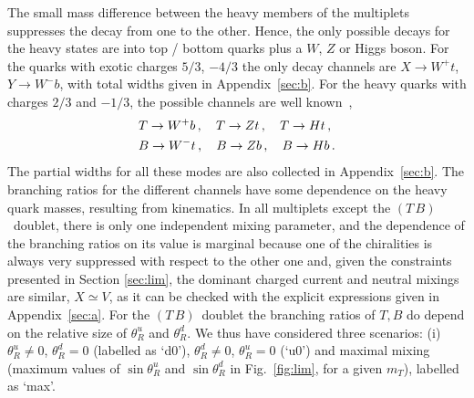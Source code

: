 \documentclass[12pt,a4paper]{article}
\newcommand{\tb}{$(T\,B)$}
\begin{document}
The small mass difference between the heavy members of the multiplets suppresses the decay from one to the other. Hence, the only possible decays for the heavy states are into top / bottom quarks plus a $W$, $Z$ or Higgs boson. For the quarks with exotic charges $5/3$, $-4/3$ the only decay channels are $X \to W^+ t$, $Y \to W^- b$, with total widths given in Appendix~\ref{sec:b}. For the heavy quarks with charges $2/3$ and $-1/3$, the possible channels are well
known~\cite{delAguila:1989rq},
\begin{align}
& T \to W^+ b \,,\quad T \to Zt \,,\quad T \to Ht \,, \notag \\
& B \to W^- t \,,\quad B \to Zb \,,\quad B \to Hb \,.
\end{align}
The partial widths for all these modes are also collected in Appendix~\ref{sec:b}.
The branching ratios for the different channels have some dependence on the heavy quark masses, resulting from kinematics. In all multiplets except the \tb\ doublet, there is only one independent mixing parameter, and the dependence of the branching ratios on its value is marginal because one of the chiralities is always very suppressed with respect to the other one and, given the constraints presented in Section \ref{sec:lim}, the dominant charged current and neutral mixings are similar, $X \simeq V$, as it can be checked with the explicit expressions given in Appendix~\ref{sec:a}. For the \tb\ doublet the branching ratios of $T,B$ do depend on the relative size of $\theta_R^u$ and $\theta_R^d$. We thus have considered three scenarios: (i) $\theta_R^u \neq 0$, $\theta_R^d=0$ (labelled as `d0'), $\theta_R^d \neq 0$, $\theta_R^u = 0$ (`u0') and maximal mixing (maximum values of $\sin \theta_R^u$ and $\sin \theta_R^d$ in Fig.~\ref{fig:lim}, for a given $m_T$), labelled as `max'.
\end{document}
